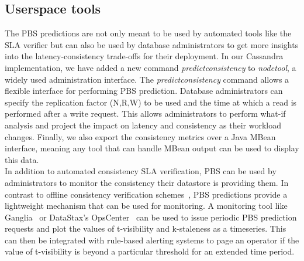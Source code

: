 \subsection{Userspace tools}
The PBS predictions are not only meant to be used by automated tools like the
SLA verifier but can also be used by database administrators to get more
insights into the latency-consistency trade-offs for their deployment. In our
Cassandra implementation, we have added a new command
\textit{predictconsistency} to \textit{nodetool}, a widely used administration
interface.  The \textit{predictconsistency} command allows a flexible interface
for performing PBS prediction. Database administrators can specify the
replication factor (N,R,W) to be used and the time at which a read is performed
after a write request. This allows administrators to perform what-if analysis
and project the impact on latency and consistency as their workload changes.
Finally, we also export the consistency metrics over a Java MBean interface,
meaning any tool that can handle MBean output can be used to display this
data.\\


In addition to automated consistency SLA verification, PBS can be used by administrators
to monitor the consistency their datastore is providing them. In contrast to
offline consistency verification schemes~\cite{podc-hp}, PBS predictions provide
a lightweight mechanism that can be used for monitoring. A monitoring tool like
Ganglia~\cite{ganglia} or DataStax's OpsCenter~\cite{ops-center} can be used to
issue  periodic PBS prediction requests and plot the values of t-visibility and
k-staleness as a timeseries. This can then be integrated with rule-based
alerting systems to page an operator if the value of t-visibility is beyond a
particular threshold for an extended time period.

